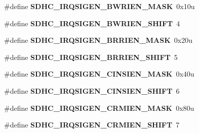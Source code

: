 \begin{DoxyCompactItemize}
\item 
\#define {\bfseries S\+D\+H\+C\+\_\+\+I\+R\+Q\+S\+I\+G\+E\+N\+\_\+\+B\+W\+R\+I\+E\+N\+\_\+\+M\+A\+SK}~0x10u\hypertarget{group__SDHC__Register__Masks_ga127a20751da5c0a3b1db2619fd29a5bf}{}\label{group__SDHC__Register__Masks_ga127a20751da5c0a3b1db2619fd29a5bf}

\item 
\#define {\bfseries S\+D\+H\+C\+\_\+\+I\+R\+Q\+S\+I\+G\+E\+N\+\_\+\+B\+W\+R\+I\+E\+N\+\_\+\+S\+H\+I\+FT}~4\hypertarget{group__SDHC__Register__Masks_ga5a0a6e7cdb390a6254c3c037d4ea241c}{}\label{group__SDHC__Register__Masks_ga5a0a6e7cdb390a6254c3c037d4ea241c}

\item 
\#define {\bfseries S\+D\+H\+C\+\_\+\+I\+R\+Q\+S\+I\+G\+E\+N\+\_\+\+B\+R\+R\+I\+E\+N\+\_\+\+M\+A\+SK}~0x20u\hypertarget{group__SDHC__Register__Masks_gaa35b18361378457cf175e01abab26611}{}\label{group__SDHC__Register__Masks_gaa35b18361378457cf175e01abab26611}

\item 
\#define {\bfseries S\+D\+H\+C\+\_\+\+I\+R\+Q\+S\+I\+G\+E\+N\+\_\+\+B\+R\+R\+I\+E\+N\+\_\+\+S\+H\+I\+FT}~5\hypertarget{group__SDHC__Register__Masks_ga2911f1a96022342a85da7994dff2a5d9}{}\label{group__SDHC__Register__Masks_ga2911f1a96022342a85da7994dff2a5d9}

\item 
\#define {\bfseries S\+D\+H\+C\+\_\+\+I\+R\+Q\+S\+I\+G\+E\+N\+\_\+\+C\+I\+N\+S\+I\+E\+N\+\_\+\+M\+A\+SK}~0x40u\hypertarget{group__SDHC__Register__Masks_gaddc99f9affd2d06d74e504cb80c3c176}{}\label{group__SDHC__Register__Masks_gaddc99f9affd2d06d74e504cb80c3c176}

\item 
\#define {\bfseries S\+D\+H\+C\+\_\+\+I\+R\+Q\+S\+I\+G\+E\+N\+\_\+\+C\+I\+N\+S\+I\+E\+N\+\_\+\+S\+H\+I\+FT}~6\hypertarget{group__SDHC__Register__Masks_gafab5ab5bba2d9d1148ad0434126f1fb2}{}\label{group__SDHC__Register__Masks_gafab5ab5bba2d9d1148ad0434126f1fb2}

\item 
\#define {\bfseries S\+D\+H\+C\+\_\+\+I\+R\+Q\+S\+I\+G\+E\+N\+\_\+\+C\+R\+M\+I\+E\+N\+\_\+\+M\+A\+SK}~0x80u\hypertarget{group__SDHC__Register__Masks_gaafb12fb025305f900bdf9df041dca2b3}{}\label{group__SDHC__Register__Masks_gaafb12fb025305f900bdf9df041dca2b3}

\item 
\#define {\bfseries S\+D\+H\+C\+\_\+\+I\+R\+Q\+S\+I\+G\+E\+N\+\_\+\+C\+R\+M\+I\+E\+N\+\_\+\+S\+H\+I\+FT}~7\hypertarget{group__SDHC__Register__Masks_ga2a4ce3b87ba3791caee5355e441fc00b}{}\label{group__SDHC__Register__Masks_ga2a4ce3b87ba3791caee5355e441fc00b}


\end{DoxyCompactItemize}
